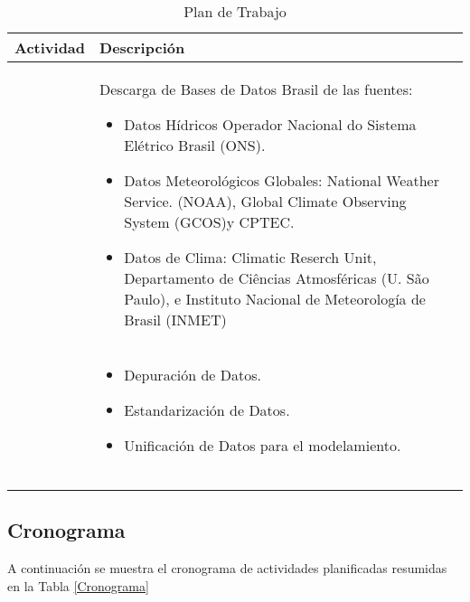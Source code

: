 \documentclass[10pt,a5paper]{article}
\begin{document}
\begin{table}[h!]
\centering

\label{TablaPlan}
\begin{tabular}{|m{2.4cm}|p{7.4cm}|}
\hline
Actividad  & Descripción  \\ \hline

\centering{Obtención de Datos} &  Descarga de Bases de Datos Brasil de las fuentes: 

\begin{itemize}

\item Datos Hídricos Operador Nacional do Sistema Elétrico Brasil (ONS).
\item Datos Meteorológicos Globales: National Weather Service. (NOAA), Global Climate Observing System (GCOS)y CPTEC.
\item Datos de Clima: Climatic Reserch Unit, Departamento de Ciências Atmosféricas (U. São Paulo), e Instituto Nacional de Meteorología de Brasil (INMET)
\end{itemize}

 \\ \hline

\centering{Tratamiento de Datos}  &  

\begin{itemize}
\item Depuración de Datos.
\item Estandarización de Datos.
\item Unificación de Datos para el modelamiento.
\end{itemize}

 \\ \hline


\centering{Análisis y Modelamiento} &   \\ \hline

\centering{Automatización} &  \\ \hline
\centering{Conclusiones y Recomendaciones} &  \\ \hline
\end{tabular}
\caption{Plan de Trabajo}
\end{table}



\subsection{Cronograma}

A continuación se muestra el cronograma de actividades planificadas resumidas en la Tabla \ref{Cronograma}
\end{document}
